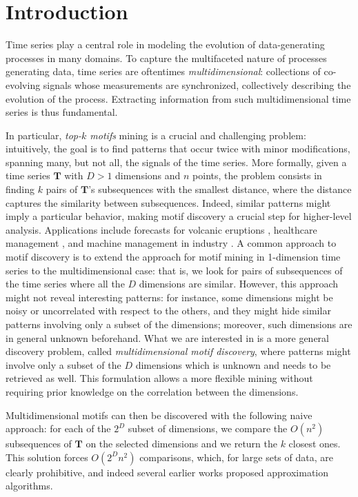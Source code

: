 \section{Introduction}
Time series play a central role in modeling the evolution of data-generating processes in many domains.
To capture the multifaceted nature of processes generating data, time series are oftentimes \emph{multidimensional}: collections of co-evolving signals whose measurements are synchronized, collectively describing the evolution of the process.
Extracting information from such multidimensional time series is thus fundamental.

In particular, \emph{top-$k$ motifs} mining is a crucial and challenging problem: intuitively, the goal is to find patterns that occur twice with minor modifications, spanning many, but not all, the signals of the time series.
More formally, given a time series $\mathbf{T}$ with $D>1$ dimensions and $n$ points, the problem consists in finding $k$ pairs of $\mathbf{T}$'s subsequences with the smallest distance, where the distance captures the similarity between subsequences.
Indeed, similar patterns might  imply a particular behavior, making motif discovery a crucial step for higher-level analysis. Applications include forecasts for volcanic eruptions \cite{2012_Cassisi}, healthcare management \cite{health2015}, and machine management in industry \cite{renard:tel-01922186}.
A common approach to motif discovery is to extend the approach for motif mining in 1-dimension time series to the multidimensional case: that is, we look for pairs of subsequences of the time series where all the $D$ dimensions are similar.
However, this approach might not reveal interesting patterns: for instance, some dimensions might be noisy or uncorrelated with respect to the others, and they might hide similar patterns involving only a subset of the dimensions; moreover, such dimensions are in general unknown beforehand.
What we are interested in is a more general discovery problem, called \textit{multidimensional motif discovery}, where patterns might involve only a subset of the $D$ dimensions which is unknown and needs to be retrieved as well.
This formulation allows a more flexible mining without requiring prior knowledge on the correlation between the dimensions.

Multidimensional motifs can then be discovered with the following naive approach:
for each of the $2^D$ subset of dimensions, we compare the $O(n^2)$ subsequences of $\mathbf{T}$ on the selected dimensions and we return the $k$ closest ones. 
This solution forces $O(2^D n^2)$ comparisons, which, for large sets of data, are clearly prohibitive, and indeed several earlier works proposed approximation algorithms. 

